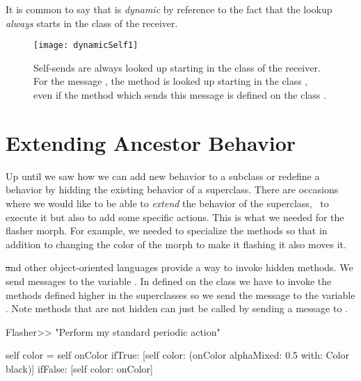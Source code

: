 It is common to say  that  is \emph{dynamic} by reference to the fact that the lookup \emph{always} starts in the class of the receiver. 

\begin{figure}
\centerline{\texttt{[image: dynamicSelf1]}} 
\caption{Self-sends are always looked up starting in the class of the receiver. For the message , the method  is looked up starting in the class , even if the method  which sends this message is defined on the class .\label{fig:dynamicSelf1}}
\end{figure}



\section{Extending Ancestor Behavior}
Up until we saw how we can add new behavior to a subclass or redefine a behavior by hidding the existing behavior of a superclass. There are occasions where we would like to be able to \emph{extend} the behavior  of the superclass, \ie\ to execute it but also to add some specific actions. This is what we needed for the flasher morph. For example, we needed to specialize the methods  so that in addition to changing the color of the morph to make it flashing it also moves it. 

\st and other object-oriented languages provide a way to invoke hidden methods. We send messages to the variable . In  defined on the class \esf we have to invoke the  methods defined higher in the superclasses so we send the message  to the variable . Note methods that are not hidden can just be called by sending a message to .  

\begin{method}\label{mth:stepinh}
Flasher>>
   "Perform my standard periodic action"

   self color = self onColor
      ifTrue: [self color: (onColor alphaMixed: 0.5 with: Color black)]
      ifFalse: [self color: onColor]
\end{method}

